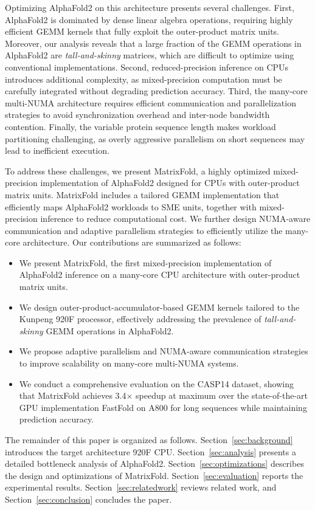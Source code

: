Optimizing AlphaFold2 on this architecture presents several challenges. First, AlphaFold2 is dominated by dense linear algebra operations, requiring highly efficient GEMM kernels that fully exploit the outer-product matrix units. Moreover, our analysis reveals that a large fraction of the GEMM operations in AlphaFold2 are \textit{tall-and-skinny} matrices, which are difficult to optimize using conventional implementations. Second, reduced-precision inference on CPUs introduces additional complexity, as mixed-precision computation must be carefully integrated without degrading prediction accuracy. Third, the many-core multi-NUMA architecture requires efficient communication and parallelization strategies to avoid synchronization overhead and inter-node bandwidth contention. Finally, the variable protein sequence length makes workload partitioning challenging, as overly aggressive parallelism on short sequences may lead to inefficient execution.

To address these challenges, we present MatrixFold, a highly optimized mixed-precision implementation of AlphaFold2 designed for CPUs with outer-product matrix units. MatrixFold includes a tailored GEMM implementation that efficiently maps AlphaFold2 workloads to SME units, together with mixed-precision inference to reduce computational cost. We further design NUMA-aware communication and adaptive parallelism strategies to efficiently utilize the many-core architecture.
Our contributions are summarized as follows:

\begin{itemize}
    \item We present MatrixFold, the first mixed-precision implementation of AlphaFold2 inference on a many-core CPU architecture with outer-product matrix units.
    \item We design outer-product-accumulator-based GEMM kernels tailored to the Kunpeng 920F processor, effectively addressing the prevalence of \textit{tall-and-skinny} GEMM operations in AlphaFold2.
    \item We propose adaptive parallelism and NUMA-aware communication strategies to improve scalability on many-core multi-NUMA systems.
    \item We conduct a comprehensive evaluation on the CASP14 dataset, showing that MatrixFold achieves 3.4$\times$ speedup at maximum over the state-of-the-art GPU implementation FastFold on A800 for long sequences while maintaining prediction accuracy.
\end{itemize}

The remainder of this paper is organized as follows. Section~\ref{sec:background} introduces the target architecture 920F CPU. Section~\ref{sec:analysis} presents a detailed bottleneck analysis of AlphaFold2. Section~\ref{sec:optimizations} describes the design and optimizations of MatrixFold. Section~\ref{sec:evaluation} reports the experimental results. Section~\ref{sec:relatedwork} reviews related work, and Section~\ref{sec:conclusion} concludes the paper.
